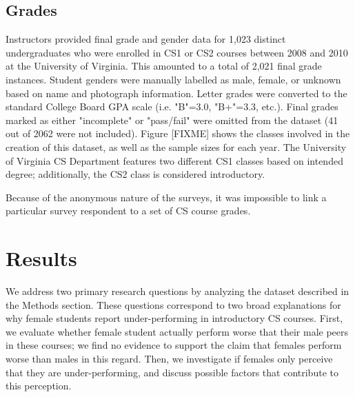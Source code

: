 \documentclass[a4paper,man,natbib]{apa6}
\begin{document}
\subsection{Grades}
\label{sec:grade}
Instructors provided final grade and gender data for 1,023 distinct
undergraduates who were enrolled in CS1 or CS2 courses between 2008 and 2010 at
the University of Virginia. This amounted to a total of 2,021 final grade
instances. Student genders were manually labelled as male, female, or unknown
based on name and photograph information. Letter grades were converted to the
standard College Board GPA scale (i.e. "B"=3.0, "B+"=3.3, etc.). Final grades
marked as either "incomplete" or "pass/fail" were omitted from the dataset (41
out of 2062 were not included). Figure [FIXME] shows the classes involved in
the creation of this dataset, as well as the sample sizes for each year. The
University of Virginia CS Department features two different CS1 classes based
on intended degree; additionally, the CS2 class is considered introductory. 

Because of the anonymous nature of the surveys, it was impossible to link a
particular survey respondent to a set of CS course grades.

\section{Results}
\label{sec:results}
We address two primary research questions by analyzing the dataset described in
the Methods section. These questions correspond to two broad explanations for
why female students report under-performing in introductory CS courses. First,
we evaluate whether female student actually perform worse that their male peers
in these courses; we find no evidence to support the claim that females perform
worse than males in this regard. Then, we investigate if females only perceive
that they are under-performing, and discuss possible factors that contribute to
this perception. 
\end{document}
